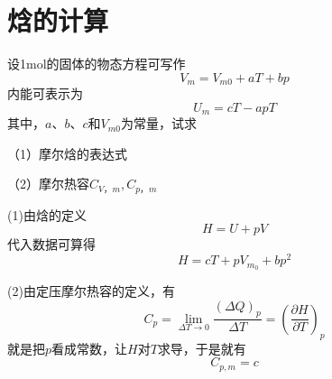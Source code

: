 \documentclass[lang=cn,10pt]{elegantbook}
\begin{document}
	\section{焓的计算}
	\begin{example}
		设1mol的固体的物态方程可写作
		\begin{equation*}
			V_{m}=V_{m0}+aT+bp
		\end{equation*}
		内能可表示为
		\begin{equation*}
			U_{m}=cT-apT
		\end{equation*}
		其中，$a$、$b$、$c$和$V_{m0}$为常量，试求
		
		（1）摩尔焓的表达式
		
		（2）摩尔热容$C_{V，m},C_{p，m}$
	\end{example}
	\begin{solution}
		
		(1)由焓的定义
		\begin{equation*}
			H=U+pV
		\end{equation*}
		代入数据可算得
		\begin{equation*}
			H=cT+pV_{m_{0}}+bp^{2}
		\end{equation*}
		
		(2)由定压摩尔热容的定义，有
		\begin{equation*}
				C_{p}=\lim_{\varDelta T\rightarrow 0} \frac{	\left( \varDelta Q \right) _p}{\varDelta T}=\left( \frac{\partial H}{\partial T} \right) _p
		\end{equation*}
		就是把$p$看成常数，让$H$对$T$求导，于是就有
		\begin{equation*}
			C_{p,m}=c
		\end{equation*}
		

\end{solution}
\end{document}
